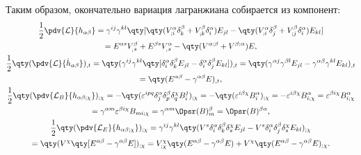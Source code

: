 \documentclass[\docroot/reports/draft/report.tex]{subfiles}
\begin{document}
    Таким образом, окончательно вариация лагранжиана собирается из компонент:
    \begin{gather*}
        \frac{1}{2}\pdv{\mathcal{L}}{h_{\alpha\beta}} =
            \gamma^{ij}\gamma^{kl} \qty[
                \qty(V^\alpha_{;i} \delta_k^\beta + V^\beta_{;k} \delta_i^\alpha) E_{jl} -
                \qty(V^\alpha_{;i} \delta_j^\beta + V^\beta_{;j} \delta_i^\alpha) E_{kl}
            ] \\ =
                E^{\alpha s} V^\beta_{_;s} + E^{\beta s} V^\alpha_{_;s} -
                \qty(V^{\alpha;\beta} + V^{\beta;\alpha}) E, \\
        \frac{1}{2}\qty(\pdv{\mathcal{L}}{\dot{h}_{\alpha\beta}})_{,t} =
            \qty(\gamma^{ij}\gamma^{kl} \qty[
                \delta_i^\alpha \delta_k^\beta E_{jl} -
                \delta_i^\alpha \delta_j^\beta E_{kl}
            ] )_{,t} =
            \qty(
                \gamma^{\alpha j}\gamma^{\beta l} E_{jl} -
                \gamma^{\alpha \beta}\gamma^{kl} E_{kl}
            )_{,t} \\ =
            \qty(
                E^{\alpha\beta} - \gamma^{\alpha\beta} E
            )_{,t} , \\
        \frac{1}{2}\qty(\pdv{\mathcal{L}_B}{h_{\alpha\beta;\chi}})_{;\chi} =
            -\qty(
                \varepsilon^{ipq} \delta_j^\alpha \delta_p^\beta \delta_q^\chi B^j_i
            )_{;\chi} =
            -\qty(
                \varepsilon^{i\beta\chi} B^\alpha_i
            )_{;\chi} =
            -\varepsilon^{i\beta\chi} B^\alpha_{i;\chi} =
            \varepsilon^{\beta i\chi} B^\alpha_{i;\chi} \\ =
            \gamma^{\alpha m} \varepsilon^{\beta i\chi} B_{mi;\chi} =
            \gamma^{\alpha m} \Opsr(B)^\beta_m =
            \Opsr(B)^{\beta\alpha} , \\
        \frac{1}{2}\qty(\pdv{\mathcal{L}_E}{h_{\alpha\beta;\chi}})_{;\chi} =
            \gamma^{ij}\gamma^{kl} \qty(
                V^s \delta_i^\alpha \delta_k^\beta \delta_s^\chi E_{jl} -
                V^s \delta_i^\alpha \delta_j^\beta \delta_s^\chi E_{kl}
            )_{;\chi} \\ =
            \qty(V^\chi \qty[
                E^{\alpha\beta} - \gamma^{\alpha\beta} E
            ])_{;\chi} =
            V^\chi_{;\chi} \qty(E^{\alpha\beta} - \gamma^{\alpha\beta} E) +
                V^\chi \qty(E^{\alpha\beta} - \gamma^{\alpha\beta} E)_{;\chi}.
    \end{gather*}
\end{document}
